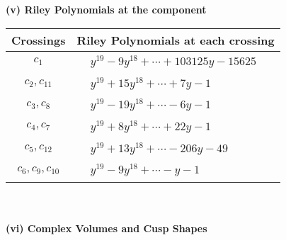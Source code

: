 \documentclass[1p]{elsarticle_modified}
\theoremstyle{definition}
\begin{document}
\newpage\renewcommand{\arraystretch}{1}
\flushleft \textbf{(v) Riley Polynomials at the component}\newline \\
\begin{tabular}{m{50pt}|m{274pt}}
Crossings & \hspace{64pt}Riley Polynomials at each crossing \\
\hline $$\begin{aligned}c_{1}\end{aligned}$$&$\begin{aligned}
&y^{19}-9 y^{18}+\cdots+103125 y-15625
\end{aligned}$\\
\hline $$\begin{aligned}c_{2},c_{11}\end{aligned}$$&$\begin{aligned}
&y^{19}+15 y^{18}+\cdots+7 y-1
\end{aligned}$\\
\hline $$\begin{aligned}c_{3},c_{8}\end{aligned}$$&$\begin{aligned}
&y^{19}-19 y^{18}+\cdots-6 y-1
\end{aligned}$\\
\hline $$\begin{aligned}c_{4},c_{7}\end{aligned}$$&$\begin{aligned}
&y^{19}+8 y^{18}+\cdots+22 y-1
\end{aligned}$\\
\hline $$\begin{aligned}c_{5},c_{12}\end{aligned}$$&$\begin{aligned}
&y^{19}+13 y^{18}+\cdots-206 y-49
\end{aligned}$\\
\hline $$\begin{aligned}c_{6},c_{9},c_{10}\end{aligned}$$&$\begin{aligned}
&y^{19}-9 y^{18}+\cdots- y-1
\end{aligned}$\\
\hline
\end{tabular}\\~\\
\newpage\flushleft \textbf{(vi) Complex Volumes and Cusp Shapes}
\end{document}
